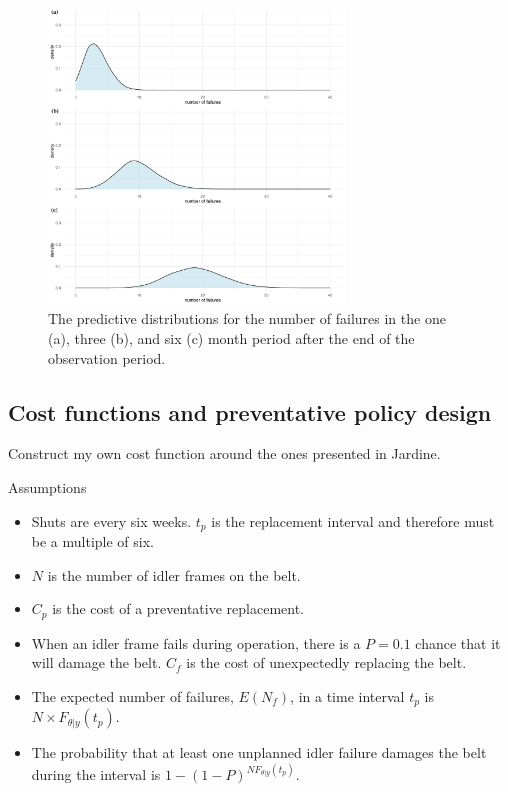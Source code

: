 \begin{figure}
  \centering
  \includegraphics[width=0.7\textwidth]{./figures/ch-3/E-n-failures-densities.pdf}
  \caption{The predictive distributions for the number of failures in the one (a), three (b), and six (c) month period after the end of the observation period.}
  \label{fig:E-Nfailrues-densities}
\end{figure}

\subsection{Cost functions and preventative policy design} \label{subsec:idler-cost-function}

Construct my own cost function around the ones presented in Jardine.

Assumptions
\begin{itemize}
  \item Shuts are every six weeks. $t_p$ is the replacement interval and therefore must be a multiple of six.
  \item $N$ is the number of idler frames on the belt.
  \item $C_p$ is the cost of a preventative replacement.
  \item When an idler frame fails during operation, there is a $P = 0.1$ chance that it will damage the belt. $C_f$ is the cost of unexpectedly replacing the belt.
  \item The expected number of failures, $E(N_f)$, in a time interval $t_p$ is $N \times F_{\theta|y}(t_p)$.
  \item The probability that at least one unplanned idler failure damages the belt during the interval is $1 - (1 - P)^{N F_{\theta|y}(t_p)}$.
\end{itemize}


